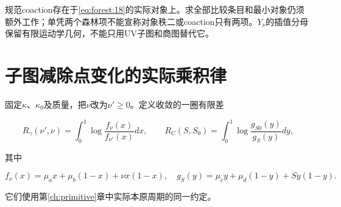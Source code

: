 \documentclass[11pt,a4paper,oneside]{ctexrep}
\theoremstyle{cnplain}
\theoremstyle{definition}
\theoremstyle{remark}
\begin{document}
规范coaction存在于\eqref{eq:forest:18}的实际对象上。求全部比较条目和最小对象仍须额外工作；单凭两个森林项不能宣称对象秩二或coaction只有两项。\(Y_\nu \)的插值分母保留有限运动学几何，不能只用UV子图和商图替代它。

\section{子图减除点变化的实际乘积律}\label{sec:forest:6}

固定\(\kappa \)、\(\kappa _0\)及质量，把\(\nu \)改为\(\nu '\ge 0\)。定义收敛的一圈有限差

\begin{equation}
R_\gamma(\nu',\nu)=\int_0^1
              \log\frac{f_\nu(x)}{f_{\nu'}(x)}dx,\qquad
 R_C(S,S_0)=\int_0^1\log\frac{g_{S0}(y)}{g_S(y)}dy,             \label{eq:forest:19}
\end{equation}

其中

\begin{equation}
f_\nu(x)=\mu_a x+\mu_b(1-x)+\nu x(1-x),\quad
 g_S(y)=\mu_c y+\mu_d(1-y)+S y(1-y).
\end{equation}

它们使用第\ref{ch:primitive}章中实际本原周期的同一约定。
\end{document}
